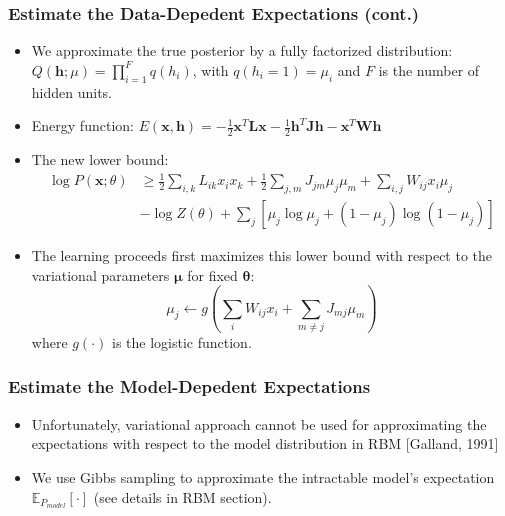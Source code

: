 \documentclass{beamer}
\newcommand{\beal}[1]{\vspace{-0.03in}\begin{align}#1\end{align}\vspace{-0.03in}}
\begin{document}
\begin{frame}
\frametitle{Estimate the Data-Depedent Expectations (cont.)}
\begin{itemize}
\item We approximate the true posterior by a fully factorized distribution: $Q(\mathbf{h};\mu)=\prod_{i=1}^{F}q(h_i)$, with $q(h_i=1)=\mu_i$ and $F$ is the number of hidden units.
\item Energy function: $E(\mathbf{x, h})=-\frac{1}{2}\mathbf{x}^T\mathbf{L}\mathbf{x}-\frac{1}{2}\mathbf{h}^T\mathbf{J}\mathbf{h}-\mathbf{x}^T\mathbf{W}\mathbf{h}$ 
\item The new lower bound:
\beal{
\log P(\mathbf{x};\theta) &\geq \frac{1}{2} \sum_{i,k} L_{ik}x_ix_k+\frac{1}{2}\sum_{j,m}J_{jm}\mu_j\mu_m+\sum_{i,j}W_{ij}x_i\mu_j\\
&-\log Z(\theta)+\sum_j[\mu_j\log \mu_j+(1-\mu_j)\log(1-\mu_j)] \nonumber
}

\item The learning proceeds first maximizes this lower bound with respect to the variational parameters $\mathbf{\mu}$ for fixed $\mathbf{\theta}$:
\begin{equation}
\mu_j \leftarrow g(\sum_i W_{ij}x_i+\sum_{m \neq j}J_{mj}\mu_m)
\end{equation}
where $g(\cdot)$ is the logistic function.
\end{itemize}
\end{frame}


\begin{frame}
\frametitle{Estimate the Model-Depedent Expectations}
\begin{itemize}
\item Unfortunately, variational approach cannot be used for approximating the expectations with respect to the model distribution in RBM [Galland, 1991]
\item We use Gibbs sampling to approximate the intractable model's expectation $\mathbb{E}_{P_{model}}[\cdot]$ (see details in RBM section). 
\end{itemize}
\end{frame}

\end{document}
